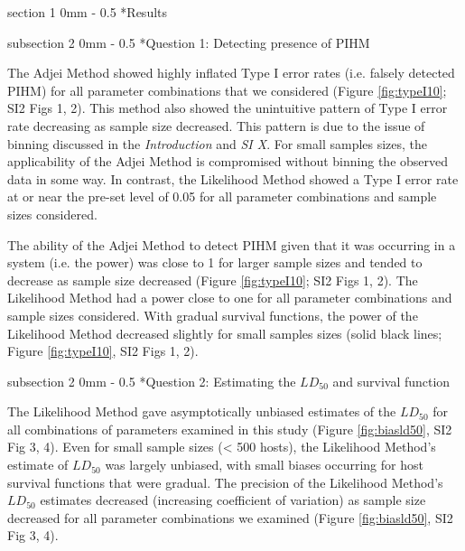 \documentclass[12pt, a4paper]{article}
\makeatletter
\renewcommand{\section}{\@startsection
{section}%
{1}%
{0mm}%
{-\baselineskip}%
{0.5\baselineskip}%
{\normalfont\bf\large}} %
\renewcommand{\subsection}{\@startsection
{subsection}%
{2}%
{0mm}%
{-\baselineskip}%
{0.5\baselineskip}%
{\normalfont\bf}} %
\makeatother
\begin{document}
\section*{Results}

\subsection*{Question 1: Detecting presence of PIHM}

The Adjei Method showed highly inflated Type I error rates (i.e. falsely detected
PIHM) for all parameter combinations that we
considered (Figure \ref{fig:typeI10}; SI2 Figs 1, 2).  This method also showed the unintuitive pattern of Type I error
rate decreasing as sample size decreased.  This pattern is due to the issue of
binning discussed in the \emph{Introduction} and \emph{SI X}. For small samples sizes, the
applicability of the Adjei Method is compromised without binning the observed
data in some way.  In contrast, the Likelihood Method showed a Type I
error rate at or near the pre-set level of 0.05 for all parameter combinations
and sample sizes considered.

The ability of the Adjei Method to detect PIHM given that it was occurring in a
system (i.e. the power) was close to 1 for larger sample sizes and tended to
decrease as sample size decreased (Figure \ref{fig:typeI10}; SI2 Figs 1, 2).  The Likelihood Method had a power close to
one for all parameter combinations and sample sizes considered.  With gradual
survival functions, the power of the Likelihood Method decreased slightly for small samples sizes (solid black lines; Figure \ref{fig:typeI10}, SI2 Figs 1, 2).


\subsection*{Question 2: Estimating the $LD_{50}$ and survival function}

The Likelihood Method gave asymptotically unbiased estimates of the $LD_{50}$
for all combinations of parameters examined in this study (Figure \ref{fig:biasld50}, SI2 Fig 3, 4).  Even for
small sample sizes (< 500 hosts), the Likelihood Method's estimate of $LD_{50}$
was largely unbiased, with small biases occurring for host survival functions
that were gradual. The precision of the Likelihood Method's $LD_{50}$ estimates decreased
(increasing coefficient of variation) as sample size decreased for all
parameter combinations we examined (Figure \ref{fig:biasld50}, SI2 Fig 3, 4).
\end{document}
